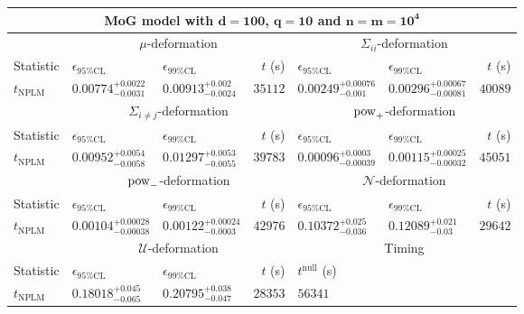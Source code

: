 \begin{tabular}{l|llr|llr}
	\toprule
	\multicolumn{7}{c}{{\bf MoG model with $\mathbf{d=100}$, $\mathbf{q=10}$ and $\mathbf{n=m=10^{4}}$}} \\
	\toprule
	\multicolumn{1}{c}{} & \multicolumn{3}{c}{$\mu$-deformation} & \multicolumn{3}{c}{$\Sigma_{ii}$-deformation} \\
	Statistic & $\epsilon_{95\%\mathrm{CL}}$ & $\epsilon_{99\%\mathrm{CL}}$ & $t$ (s) & $\epsilon_{95\%\mathrm{CL}}$ & $\epsilon_{99\%\mathrm{CL}}$ & $t$ (s) \\
	\midrule
	$t_{\mathrm{NPLM}}$ & $0.00774_{-0.0031}^{+0.0022}$ & $0.00913_{-0.0024}^{+0.002}$ & $35112$ & $0.00249_{-0.001}^{+0.00076}$ & $0.00296_{-0.00081}^{+0.00067}$ & $40089$ \\
	\toprule
	\multicolumn{1}{c}{} & \multicolumn{3}{c}{$\Sigma_{i\neq j}$-deformation} & \multicolumn{3}{c}{$\rm{pow}_{+}$-deformation} \\
	Statistic & $\epsilon_{95\%\mathrm{CL}}$ & $\epsilon_{99\%\mathrm{CL}}$ & $t$ (s) & $\epsilon_{95\%\mathrm{CL}}$ & $\epsilon_{99\%\mathrm{CL}}$ & $t$ (s) \\
	\midrule
	$t_{\mathrm{NPLM}}$ & $0.00952_{-0.0058}^{+0.0054}$ & $0.01297_{-0.0055}^{+0.0053}$ & $39783$ & $0.00096_{-0.00039}^{+0.0003}$ & $0.00115_{-0.00032}^{+0.00025}$ & $45051$ \\
	\toprule
	\multicolumn{1}{c}{} & \multicolumn{3}{c}{$\rm{pow}_{-}$-deformation} & \multicolumn{3}{c}{$\mathcal{N}$-deformation} \\
	Statistic & $\epsilon_{95\%\mathrm{CL}}$ & $\epsilon_{99\%\mathrm{CL}}$ & $t$ (s) & $\epsilon_{95\%\mathrm{CL}}$ & $\epsilon_{99\%\mathrm{CL}}$ & $t$ (s) \\
	\midrule
	$t_{\mathrm{NPLM}}$ & $0.00104_{-0.00038}^{+0.00028}$ & $0.00122_{-0.0003}^{+0.00024}$ & $42976$ & $0.10372_{-0.036}^{+0.025}$ & $0.12089_{-0.03}^{+0.021}$ & $29642$ \\
	\toprule
	\multicolumn{1}{c}{} & \multicolumn{3}{c}{$\mathcal{U}$-deformation} & \multicolumn{3}{c}{Timing} \\
	Statistic & $\epsilon_{95\%\mathrm{CL}}$ & $\epsilon_{99\%\mathrm{CL}}$ & $t$ (s) & $t^{\mathrm{null}}$ (s) \\
	\midrule
	$t_{\mathrm{NPLM}}$ & $0.18018_{-0.065}^{+0.045}$ & $0.20795_{-0.047}^{+0.038}$ & $28353$ & $56341$ \\
	\bottomrule
\end{tabular}
